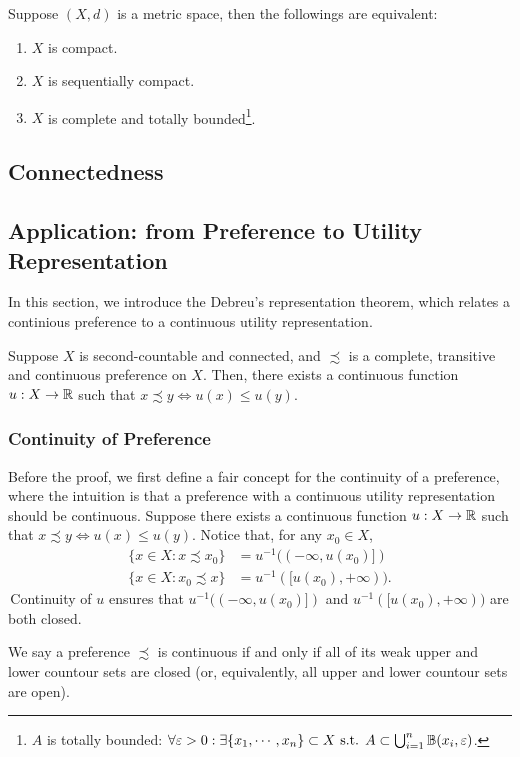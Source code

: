 \begin{theorem}
    Suppose $(X,d)$ is a metric space, then the followings are equivalent:
    \begin{enumerate}
        \item $X$ is compact.
        \item $X$ is sequentially compact.
        \item $X$ is complete and totally bounded\footnote{$A$ is totally bounded: $\forall \varepsilon >0 : \exists \{x_1, \cdots, x_n\} \subset X \text{ s.t. } A \subset \bigcup_{i=1}^n \mathbb{B} (x_i,\varepsilon)$.}.
    \end{enumerate}
\end{theorem}

\subsection{Connectedness}

\subsection{Application: from Preference to Utility Representation}
In this section, we introduce the Debreu's representation theorem, which relates a continious preference to a continuous utility representation.
\begin{theorem}[Debreu]  
    Suppose $X$ is second-countable and connected, and $\precsim$ is a complete, transitive and continuous preference on $X$. Then, there exists a continuous function $u:X \to \mathbb{R}$ such that $x\precsim y \iff u(x) \leq u(y)$.
\end{theorem}

\subsubsection{Continuity of Preference}
Before the proof, we first define a fair concept for the continuity of a preference, where the intuition is that a preference with a continuous utility representation should be continuous. Suppose there exists a continuous function $u:X \to \mathbb{R}$ such that $x\precsim y \iff u(x) \leq u(y)$. Notice that, for any $x_0\in X$,
$$\begin{aligned}
    \{x\in X:x\precsim x_0\}&= u^{-1}((-\infty,u(x_0)])\\
\{x\in X:x_0\precsim x\}&= u^{-1}([u(x_0),+\infty)).
\end{aligned}$$
\,Continuity of $u$ ensures that $u^{-1}((-\infty,u(x_0)])$ and $u^{-1}([u(x_0),+\infty))$ are both closed. 
\begin{definition}
    We say a preference $\precsim$ is continuous if and only if all of its weak upper and lower countour sets are closed (or, equivalently, all upper and lower countour sets are open).
\end{definition}

